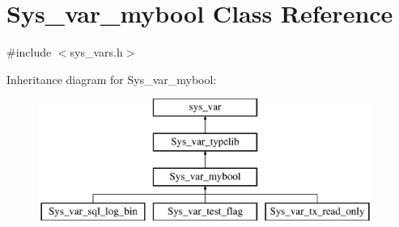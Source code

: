 \hypertarget{classSys__var__mybool}{}\section{Sys\+\_\+var\+\_\+mybool Class Reference}
\label{classSys__var__mybool}


{\ttfamily \#include $<$sys\+\_\+vars.\+h$>$}

Inheritance diagram for Sys\+\_\+var\+\_\+mybool\+:\begin{figure}[H]
\begin{center}
\leavevmode
\includegraphics[height=4.000000cm]{classSys__var__mybool}
\end{center}
\end{figure}
